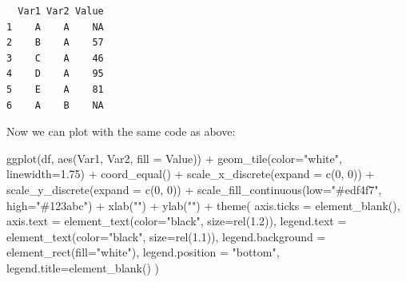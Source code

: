 \documentclass[
  letterpaper,
  DIV=11,
  numbers=noendperiod]{scrreprt}
\newenvironment{Shaded}{\begin{snugshade}}{\end{snugshade}}
\newcommand{\AttributeTok}[1]{\textcolor[rgb]{0.40,0.45,0.13}{#1}}
\newcommand{\ConstantTok}[1]{\textcolor[rgb]{0.56,0.35,0.01}{#1}}
\newcommand{\DecValTok}[1]{\textcolor[rgb]{0.68,0.00,0.00}{#1}}
\newcommand{\FloatTok}[1]{\textcolor[rgb]{0.68,0.00,0.00}{#1}}
\newcommand{\FunctionTok}[1]{\textcolor[rgb]{0.28,0.35,0.67}{#1}}
\newcommand{\NormalTok}[1]{\textcolor[rgb]{0.00,0.23,0.31}{#1}}
\newcommand{\OtherTok}[1]{\textcolor[rgb]{0.00,0.23,0.31}{#1}}
\newcommand{\SpecialCharTok}[1]{\textcolor[rgb]{0.37,0.37,0.37}{#1}}
\newcommand{\StringTok}[1]{\textcolor[rgb]{0.13,0.47,0.30}{#1}}
\begin{document}
\begin{Shaded}
\end{Shaded}

\begin{verbatim}
  Var1 Var2 Value
1    A    A    NA
2    B    A    57
3    C    A    46
4    D    A    95
5    E    A    81
6    A    B    NA
\end{verbatim}

Now we can plot with the same code as above:

\begin{Shaded}
\begin{Highlighting}[]
\FunctionTok{ggplot}\NormalTok{(df, }\FunctionTok{aes}\NormalTok{(Var1, Var2, }\AttributeTok{fill =}\NormalTok{ Value)) }\SpecialCharTok{+} 
  \FunctionTok{geom\_tile}\NormalTok{(}\AttributeTok{color=}\StringTok{"white"}\NormalTok{, }\AttributeTok{linewidth=}\FloatTok{1.75}\NormalTok{) }\SpecialCharTok{+}
  \FunctionTok{coord\_equal}\NormalTok{() }\SpecialCharTok{+}
  \FunctionTok{scale\_x\_discrete}\NormalTok{(}\AttributeTok{expand =} \FunctionTok{c}\NormalTok{(}\DecValTok{0}\NormalTok{, }\DecValTok{0}\NormalTok{)) }\SpecialCharTok{+}
  \FunctionTok{scale\_y\_discrete}\NormalTok{(}\AttributeTok{expand =} \FunctionTok{c}\NormalTok{(}\DecValTok{0}\NormalTok{, }\DecValTok{0}\NormalTok{)) }\SpecialCharTok{+} 
  \FunctionTok{scale\_fill\_continuous}\NormalTok{(}\AttributeTok{low=}\StringTok{"\#edf4f7"}\NormalTok{, }\AttributeTok{high=}\StringTok{"\#123abc"}\NormalTok{) }\SpecialCharTok{+}
  \FunctionTok{xlab}\NormalTok{(}\StringTok{""}\NormalTok{) }\SpecialCharTok{+} 
  \FunctionTok{ylab}\NormalTok{(}\StringTok{""}\NormalTok{) }\SpecialCharTok{+}
  \FunctionTok{theme}\NormalTok{(}
    \AttributeTok{axis.ticks =} \FunctionTok{element\_blank}\NormalTok{(), }
    \AttributeTok{axis.text =} \FunctionTok{element\_text}\NormalTok{(}\AttributeTok{color=}\StringTok{"black"}\NormalTok{, }\AttributeTok{size=}\FunctionTok{rel}\NormalTok{(}\FloatTok{1.2}\NormalTok{)),}
    \AttributeTok{legend.text =} \FunctionTok{element\_text}\NormalTok{(}\AttributeTok{color=}\StringTok{"black"}\NormalTok{, }\AttributeTok{size=}\FunctionTok{rel}\NormalTok{(}\FloatTok{1.1}\NormalTok{)),}
    \AttributeTok{legend.background =} \FunctionTok{element\_rect}\NormalTok{(}\AttributeTok{fill=}\StringTok{"white"}\NormalTok{),}
    \AttributeTok{legend.position =} \StringTok{"bottom"}\NormalTok{,}
    \AttributeTok{legend.title=}\FunctionTok{element\_blank}\NormalTok{()}
\NormalTok{  ) }
\end{Highlighting}
\end{Shaded}
\end{document}
